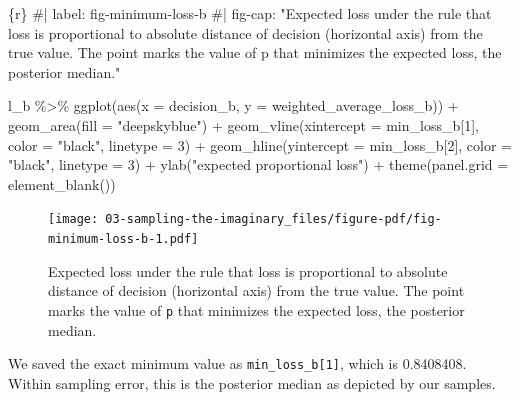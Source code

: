 \documentclass[
  letterpaper,
  DIV=11,
  numbers=noendperiod]{scrreprt}
\newenvironment{Shaded}{\begin{snugshade}}{\end{snugshade}}
\newcommand{\AttributeTok}[1]{\textcolor[rgb]{0.40,0.45,0.13}{#1}}
\newcommand{\CommentTok}[1]{\textcolor[rgb]{0.37,0.37,0.37}{#1}}
\newcommand{\DecValTok}[1]{\textcolor[rgb]{0.68,0.00,0.00}{#1}}
\newcommand{\FunctionTok}[1]{\textcolor[rgb]{0.28,0.35,0.67}{#1}}
\newcommand{\InformationTok}[1]{\textcolor[rgb]{0.37,0.37,0.37}{#1}}
\newcommand{\NormalTok}[1]{\textcolor[rgb]{0.00,0.23,0.31}{#1}}
\newcommand{\SpecialCharTok}[1]{\textcolor[rgb]{0.37,0.37,0.37}{#1}}
\newcommand{\StringTok}[1]{\textcolor[rgb]{0.13,0.47,0.30}{#1}}
\begin{document}
\begin{Shaded}
\begin{Highlighting}[]
\InformationTok{\textasciigrave{}\textasciigrave{}\textasciigrave{}\{r\}}
\CommentTok{\#| label: fig{-}minimum{-}loss{-}b}
\CommentTok{\#| fig{-}cap: "Expected loss under the rule that loss is proportional to absolute distance of decision (horizontal axis) from the true value. The point marks the value of \textasciigrave{}p\textasciigrave{} that minimizes the expected loss, the posterior median."}

\NormalTok{l\_b }\SpecialCharTok{\%\textgreater{}\%}   
  \FunctionTok{ggplot}\NormalTok{(}\FunctionTok{aes}\NormalTok{(}\AttributeTok{x =}\NormalTok{ decision\_b, }\AttributeTok{y =}\NormalTok{ weighted\_average\_loss\_b)) }\SpecialCharTok{+}
  \FunctionTok{geom\_area}\NormalTok{(}\AttributeTok{fill =} \StringTok{"deepskyblue"}\NormalTok{) }\SpecialCharTok{+}
  \FunctionTok{geom\_vline}\NormalTok{(}\AttributeTok{xintercept =}\NormalTok{ min\_loss\_b[}\DecValTok{1}\NormalTok{], }\AttributeTok{color =} \StringTok{"black"}\NormalTok{, }\AttributeTok{linetype =} \DecValTok{3}\NormalTok{) }\SpecialCharTok{+}
  \FunctionTok{geom\_hline}\NormalTok{(}\AttributeTok{yintercept =}\NormalTok{ min\_loss\_b[}\DecValTok{2}\NormalTok{], }\AttributeTok{color =} \StringTok{"black"}\NormalTok{, }\AttributeTok{linetype =} \DecValTok{3}\NormalTok{) }\SpecialCharTok{+}
  \FunctionTok{ylab}\NormalTok{(}\StringTok{"expected proportional loss"}\NormalTok{) }\SpecialCharTok{+}
  \FunctionTok{theme}\NormalTok{(}\AttributeTok{panel.grid =} \FunctionTok{element\_blank}\NormalTok{())}
\InformationTok{\textasciigrave{}\textasciigrave{}\textasciigrave{}}
\end{Highlighting}
\end{Shaded}

\begin{figure}[H]

{\centering \texttt{[image: 03-sampling-the-imaginary\_files/figure-pdf/fig-minimum-loss-b-1.pdf]}

}

\caption{\label{fig-minimum-loss-b}Expected loss under the rule that
loss is proportional to absolute distance of decision (horizontal axis)
from the true value. The point marks the value of \texttt{p} that
minimizes the expected loss, the posterior median.}

\end{figure}

We saved the exact minimum value as \texttt{min\_loss\_b{[}1{]}}, which
is 0.8408408. Within sampling error, this is the posterior median as
depicted by our samples.
\end{document}
